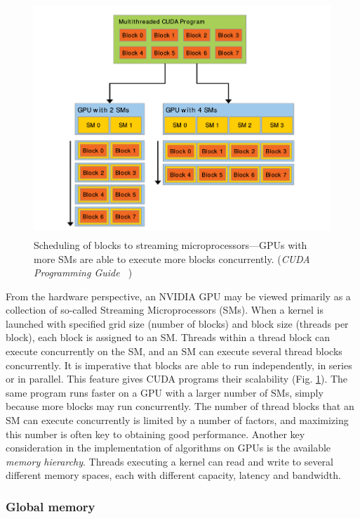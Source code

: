 \begin{figure}
\begin{center}
\includegraphics[height=250pt]{img/gpu-scaling.png}
\end{center}
\caption{Scheduling of blocks to streaming microprocessors---GPUs
    with more SMs are able to execute more blocks concurrently.
(\emph{CUDA Programming Guide ~\cite{CUDAProgrammingGuide}})}
\label{fig:gpu-scaling}
\end{figure}

From the hardware perspective,
an NVIDIA GPU may be viewed primarily as
a collection of so-called Streaming Microprocessors (SMs).
When a kernel is launched with specified
grid size (number of blocks)
and block size (threads per block),
each block is assigned to an SM.
Threads within a thread block can execute concurrently on the SM,
and an SM can execute several thread blocks concurrently.
It is imperative that blocks are able to run
independently, in series or in parallel.
This feature gives CUDA programs
their scalability (Fig. \ref{fig:gpu-scaling}).
The same program runs faster on a GPU with a larger number
of SMs, simply because more blocks may run concurrently.
The number of thread blocks that an
SM can execute concurrently
is limited by a number of factors,
and maximizing this number is often
key to obtaining good performance.
Another key consideration in the implementation
of algorithms on GPUs is the
available \emph{memory hierarchy}.
Threads executing a kernel can read and write
to several different memory spaces,
each with different capacity, latency and bandwidth.

\subsubsection{Global memory}

